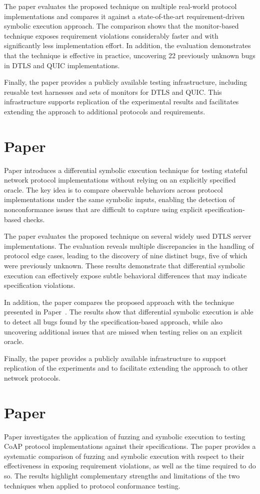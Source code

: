 The paper evaluates the proposed technique on multiple real-world protocol implementations and compares it against a state-of-the-art requirement-driven symbolic execution approach.
The comparison shows that the monitor-based technique exposes requirement violations considerably faster and with significantly less implementation effort.
In addition, the evaluation demonstrates that the technique is effective in practice, uncovering 22 previously unknown bugs in DTLS and QUIC implementations.

Finally, the paper provides a publicly available testing infrastructure, including reusable test harnesses and sets of monitors for DTLS and QUIC.
This infrastructure supports replication of the experimental results and facilitates extending the approach to additional protocols and requirements.

\section{Paper }
Paper  introduces a differential symbolic execution technique for testing stateful network protocol implementations without relying on an explicitly specified oracle.
The key idea is to compare observable behaviors across protocol implementations under the same symbolic inputs, enabling the detection of nonconformance issues that are difficult to capture using explicit specification-based checks.

The paper evaluates the proposed technique on several widely used DTLS server implementations.
The evaluation reveals multiple discrepancies in the handling of protocol edge cases, leading to the discovery of nine distinct bugs, five of which were previously unknown.
These results demonstrate that differential symbolic execution can effectively expose subtle behavioral differences that may indicate specification violations.

In addition, the paper compares the proposed approach with the technique presented in Paper~.
The results show that differential symbolic execution is able to detect all bugs found by the specification-based approach, while also uncovering additional issues that are missed when testing relies on an explicit oracle.

Finally, the paper provides a publicly available infrastructure to support replication of the experiments and to facilitate extending the approach to other network protocols.

\section{Paper }
Paper  investigates the application of fuzzing and symbolic execution to testing CoAP protocol implementations against their specifications.
The paper provides a systematic comparison of fuzzing and symbolic execution with respect to their effectiveness in exposing requirement violations, as well as the time required to do so.
The results highlight complementary strengths and limitations of the two techniques when applied to protocol conformance testing.

